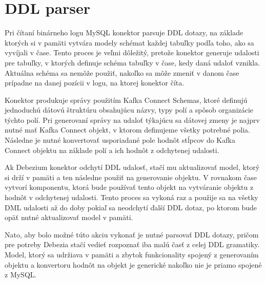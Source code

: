 
\section{DDL parser}
Pri čítaní binárneho logu MySQL konektor parsuje DDL dotazy, na základe ktorých si v pamäti vytvára modely schémat každej tabuľky podľa toho, ako sa vyvíjali v čase. Tento proces je veľmi dôležitý, pretože konektor generuje udalosti pre tabuľky, v ktorých definuje schéma tabuľky v čase, kedy daná udaloť vznikla. Aktuálna schéma sa nemôže použiť, nakoľko sa môže zmeniť v danom čase prípadne na danej pozícii v logu, na ktorej konektor číta. 

Konektor produkuje správy použitím Kafka Connect Schemas, ktoré definujú jednoduchú dátovú štruktúru obsahujúcu názvy, typy polí a spôsob organizácie týchto polí. Pri generovaní správy na udaloť týkajúcu sa dátovej zmeny je najprv nutné mať Kafka Connect  objekt, v ktorom definujeme všetky potrebné polia. Následne je nutné konvertovať usporiadané pole hodnôt stĺpcov do Kafka Connect  objektu na základe polí a ich hodnôt z odchytenej udalosti.

Ak Debezium konektor odchytí DDL udalosť, stačí mu aktualizovať model, ktorý si drží v pamäti a ten následne použiť na generovanie  objektu. V rovnakom čase vytvorí komponentu, ktorá bude používať tento  objekt na vytváranie  objektu z hodnôt v odchytenej udalosti. Tento proces sa vykoná raz a použije sa na všetky DML udalosti až do doby pokiaľ sa neodchytí ďalší DDL dotaz, po ktorom bude opäť nutné aktualizovať model v pamäti.

Nato, aby bolo možné túto akciu vykonať je nutné parsovať DDL dotazy, pričom pre potreby Debezia stačí vedieť rozpoznať iba malú časť z celej DDL gramatiky. Model, ktorý sa udržiava v pamäti a zbytok funkcionality spojený z generovaním  objektu a konvertoru hodnôt na  objekt je generické nakoľko nie je priamo spojené z MySQL.


